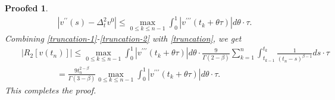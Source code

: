 \documentclass[10pt,a4paper]{amsart}
\newtheorem{proofed}{Proofed}
\begin{document}
\begin{proofed}
\begin{eqnarray}
 |v^{\prime\prime}(s)-\Delta_t^2 v^{0}|\leq \max_{0\leq k\leq n-1}\int_{0}^{1}|v^{\prime\prime\prime}(t_{k}+\theta \tau)|d\theta\cdot \tau. \label{truncation-2}
\end{eqnarray}
Combining  \eqref{truncation-1}-\eqref{truncation-2} with \eqref{truncation}, we get
\begin{eqnarray}
&& |R_2[v(t_n)]| \leq  \max_{0\leq k\leq n-1}\int_{0}^{1}|v^{\prime\prime\prime}(t_{k}+\theta \tau)|d\theta \cdot \frac{9}{\Gamma{(2-\beta)} } \sum_{k=1}^n \int_{t_{k-1}}^{t_k} \frac{1}{(t_n-s)^{\beta-1}}ds \cdot \tau
\nonumber \\
&&\qquad\qquad~
 = \frac{9t_n^{2-\beta}}{\Gamma{(3-\beta)}} \max_{0\leq k\leq n-1}\int_{0}^{1}|v^{\prime\prime\prime}(t_{k}+\theta \tau)|d\theta \cdot \tau.
\end{eqnarray}
This completes the proof.
\end{proofed}
\end{document}

